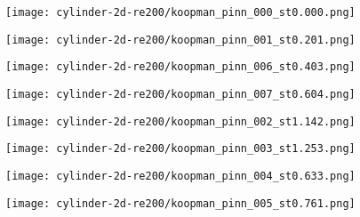 \begin{figure*}[!hbt]
    \centering%
    \texttt{[image: cylinder-2d-re200/koopman\_pinn\_000\_st0.000.png]}%
    \caption{%
        The \num{1}st primary mode in data-driven PINN.
    }
    \label{fig:cylinder-re200-koopman-pinn-primary-1st}%
\end{figure*}

\begin{figure*}[!hbt]
    \centering%
    \texttt{[image: cylinder-2d-re200/koopman\_pinn\_001\_st0.201.png]}%
    \caption{%
        The \num{2}nd primary mode in data-driven PINN.
    }
    \label{fig:cylinder-re200-koopman-pinn-primary-2nd}%
\end{figure*}

\begin{figure*}[!hbt]
    \centering%
    \texttt{[image: cylinder-2d-re200/koopman\_pinn\_006\_st0.403.png]}%
    \caption{%
        The \num{3}rd primary mode in data-driven PINN.
    }
    \label{fig:cylinder-re200-koopman-pinn-primary-3rd}%
\end{figure*}

\begin{figure*}[!hbt]
    \centering%
    \texttt{[image: cylinder-2d-re200/koopman\_pinn\_007\_st0.604.png]}%
    \caption{%
        The \num{4}th primary mode in data-driven PINN.
    }
    \label{fig:cylinder-re200-koopman-pinn-primary-4th}%
\end{figure*}

\begin{figure*}[!hbt]
    \centering%
    \texttt{[image: cylinder-2d-re200/koopman\_pinn\_002\_st1.142.png]}%
    \caption{%
        The \num{1}st damped mode in data-driven PINN.
    }
    \label{fig:cylinder-re200-koopman-pinn-damped-1st}%
\end{figure*}

\begin{figure*}[!hbt]
    \centering%
    \texttt{[image: cylinder-2d-re200/koopman\_pinn\_003\_st1.253.png]}%
    \caption{%
        The \num{2}nd damped mode in data-driven PINN.
    }
    \label{fig:cylinder-re200-koopman-pinn-damped-2nd}%
\end{figure*}

\begin{figure*}[!hbt]
    \centering%
    \texttt{[image: cylinder-2d-re200/koopman\_pinn\_004\_st0.633.png]}%
    \caption{%
        The \num{3}rd damped mode in data-driven PINN.
    }
    \label{fig:cylinder-re200-koopman-pinn-damped-3rd}%
\end{figure*}

\begin{figure*}[!hbt]
    \centering%
    \texttt{[image: cylinder-2d-re200/koopman\_pinn\_005\_st0.761.png]}%
    \caption{%
        The \num{4}th damped mode in data-driven PINN.
    }
    \label{fig:cylinder-re200-koopman-pinn-damped-4th}%
\end{figure*}

